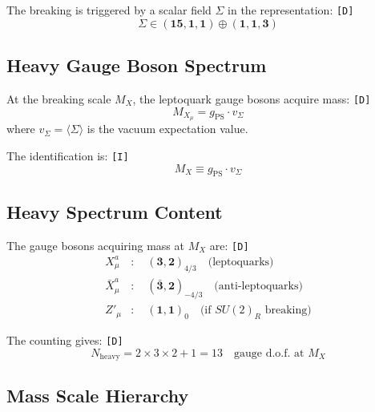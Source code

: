 \documentclass[11pt,a4paper]{article}
\newcommand{\tagD}{\textcolor{green!50!black}{\texttt{[D]}}}
\newcommand{\tagI}{\textcolor{purple!70!black}{\texttt{[I]}}}
\theoremstyle{definition}
\begin{document}
The breaking is triggered by a scalar field $\Sigma$ in the representation: \tagD{}
\begin{equation}
\label{eq:sigma-rep}
\Sigma \in (\mathbf{15}, \mathbf{1}, \mathbf{1}) \oplus (\mathbf{1}, \mathbf{1}, \mathbf{3})
\end{equation}

\subsection{Heavy Gauge Boson Spectrum}
\label{subsec:heavy-spectrum}

At the breaking scale $M_X$, the leptoquark gauge bosons acquire mass: \tagD{}
\begin{equation}
\label{eq:leptoquark-mass}
M_{X_\mu} = g_{\text{PS}} \cdot v_\Sigma
\end{equation}
where $v_\Sigma = \langle \Sigma \rangle$ is the vacuum expectation value.

The identification is: \tagI{}
\begin{equation}
\label{eq:mx-vev-identification}
\boxed{M_X \equiv g_{\text{PS}} \cdot v_\Sigma}
\end{equation}

\subsection{Heavy Spectrum Content}
\label{subsec:spectrum-content}

The gauge bosons acquiring mass at $M_X$ are: \tagD{}
\begin{align}
\label{eq:heavy-x}
X_\mu^{a} &: \quad (\mathbf{3}, \mathbf{2})_{4/3} \quad \text{(leptoquarks)} \\
\label{eq:heavy-y}
\bar{X}_\mu^{a} &: \quad (\bar{\mathbf{3}}, \mathbf{2})_{-4/3} \quad \text{(anti-leptoquarks)} \\
\label{eq:heavy-z}
Z'_\mu &: \quad (\mathbf{1}, \mathbf{1})_0 \quad \text{(if } SU(2)_R \text{ breaking)}
\end{align}

The counting gives: \tagD{}
\begin{equation}
\label{eq:dof-counting}
N_{\text{heavy}} = 2 \times 3 \times 2 + 1 = 13 \quad \text{gauge d.o.f.\ at } M_X
\end{equation}

\subsection{Mass Scale Hierarchy}
\label{subsec:hierarchy}
\end{document}
